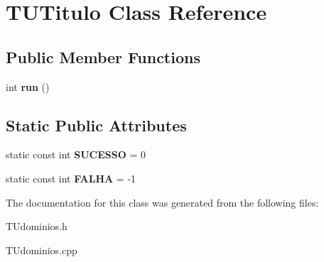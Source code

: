 \hypertarget{classTUTitulo}{}\section{T\+U\+Titulo Class Reference}
\label{classTUTitulo}
\subsection*{Public Member Functions}
\begin{DoxyCompactItemize}
\item 
\mbox{\label{classTUTitulo_a2bf05b935f07f368b03c694d1f8ce8c7}} 
int {\bfseries run} ()
\end{DoxyCompactItemize}
\subsection*{Static Public Attributes}
\begin{DoxyCompactItemize}
\item 
\mbox{\label{classTUTitulo_aaea6696cee40d23798e3777c1e17688f}} 
static const int {\bfseries S\+U\+C\+E\+S\+SO} = 0
\item 
\mbox{\label{classTUTitulo_a5f60ebb41aa0607f6a7a4b825907b6ee}} 
static const int {\bfseries F\+A\+L\+HA} = -\/1
\end{DoxyCompactItemize}


The documentation for this class was generated from the following files\+:\begin{DoxyCompactItemize}
\item 
T\+Udominios.\+h\item 
T\+Udominios.\+cpp\end{DoxyCompactItemize}
